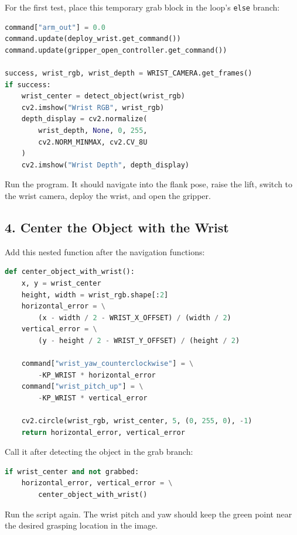 \documentclass[11pt,a4paper]{article}
\begin{document}
For the first test, place this temporary grab block in the loop's
\texttt{else} branch:

\begin{lstlisting}[language=Python]
command["arm_out"] = 0.0
command.update(deploy_wrist.get_command())
command.update(gripper_open_controller.get_command())

success, wrist_rgb, wrist_depth = WRIST_CAMERA.get_frames()
if success:
    wrist_center = detect_object(wrist_rgb)
    cv2.imshow("Wrist RGB", wrist_rgb)
    depth_display = cv2.normalize(
        wrist_depth, None, 0, 255,
        cv2.NORM_MINMAX, cv2.CV_8U
    )
    cv2.imshow("Wrist Depth", depth_display)
\end{lstlisting}

Run the program. It should navigate into the flank pose, raise the lift, switch
to the wrist camera, deploy the wrist, and open the gripper.

\subsection*{4. Center the Object with the Wrist}

Add this nested function after the navigation functions:

\begin{lstlisting}[language=Python]
def center_object_with_wrist():
    x, y = wrist_center
    height, width = wrist_rgb.shape[:2]
    horizontal_error = \
        (x - width / 2 - WRIST_X_OFFSET) / (width / 2)
    vertical_error = \
        (y - height / 2 - WRIST_Y_OFFSET) / (height / 2)

    command["wrist_yaw_counterclockwise"] = \
        -KP_WRIST * horizontal_error
    command["wrist_pitch_up"] = \
        -KP_WRIST * vertical_error

    cv2.circle(wrist_rgb, wrist_center, 5, (0, 255, 0), -1)
    return horizontal_error, vertical_error
\end{lstlisting}

Call it after detecting the object in the grab branch:

\begin{lstlisting}[language=Python]
if wrist_center and not grabbed:
    horizontal_error, vertical_error = \
        center_object_with_wrist()
\end{lstlisting}

Run the script again. The wrist pitch and yaw should keep the green point near
the desired grasping location in the image.
\end{document}

